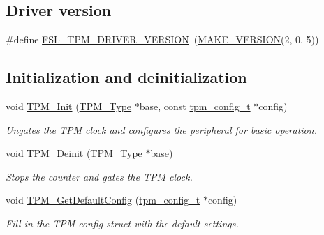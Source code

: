 \subsection*{Driver version}
\begin{DoxyCompactItemize}
\item 
\#define \mbox{\hyperlink{group__tpm_ga54511b6d5433142e99df1dfd8c0816ef}{F\+S\+L\+\_\+\+T\+P\+M\+\_\+\+D\+R\+I\+V\+E\+R\+\_\+\+V\+E\+R\+S\+I\+ON}}~(\mbox{\hyperlink{group__ftfx__utilities_ga812138aa3315b0c6953c1a26130bcc37}{M\+A\+K\+E\+\_\+\+V\+E\+R\+S\+I\+ON}}(2, 0, 5))
\end{DoxyCompactItemize}
\subsection*{Initialization and deinitialization}
\begin{DoxyCompactItemize}
\item 
void \mbox{\hyperlink{group__tpm_gae56e6feacdb75884b00b81256ae4a795}{T\+P\+M\+\_\+\+Init}} (\mbox{\hyperlink{struct_t_p_m___type}{T\+P\+M\+\_\+\+Type}} $\ast$base, const \mbox{\hyperlink{group__tpm_ga5647039a18486c876df5cdeb84c9621d}{tpm\+\_\+config\+\_\+t}} $\ast$config)
\begin{DoxyCompactList}\small\item\em Ungates the T\+PM clock and configures the peripheral for basic operation. \end{DoxyCompactList}\item 
void \mbox{\hyperlink{group__tpm_ga8b642860d51c3c6ef94df8c313c31e91}{T\+P\+M\+\_\+\+Deinit}} (\mbox{\hyperlink{struct_t_p_m___type}{T\+P\+M\+\_\+\+Type}} $\ast$base)
\begin{DoxyCompactList}\small\item\em Stops the counter and gates the T\+PM clock. \end{DoxyCompactList}\item 
void \mbox{\hyperlink{group__tpm_ga53fcb634d4c70d9bcb14c972944d949f}{T\+P\+M\+\_\+\+Get\+Default\+Config}} (\mbox{\hyperlink{group__tpm_ga5647039a18486c876df5cdeb84c9621d}{tpm\+\_\+config\+\_\+t}} $\ast$config)
\begin{DoxyCompactList}\small\item\em Fill in the T\+PM config struct with the default settings. \end{DoxyCompactList}\end{DoxyCompactItemize}
